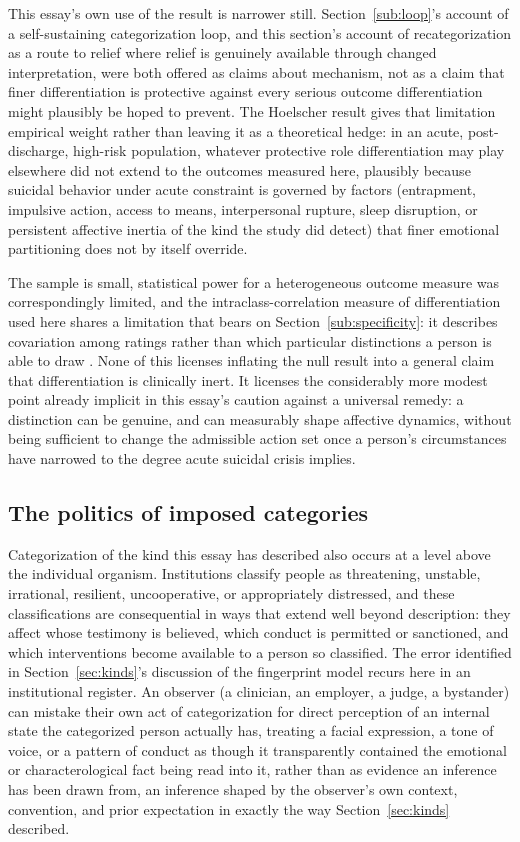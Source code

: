 \documentclass[11pt]{article}
\begin{document}
This essay's own use of the result is narrower still. Section~\ref{sub:loop}'s account of a self-sustaining categorization loop, and this section's account of recategorization as a route to relief where relief is genuinely available through changed interpretation, were both offered as claims about mechanism, not as a claim that finer differentiation is protective against every serious outcome differentiation might plausibly be hoped to prevent. The Hoelscher result gives that limitation empirical weight rather than leaving it as a theoretical hedge: in an acute, post-discharge, high-risk population, whatever protective role differentiation may play elsewhere did not extend to the outcomes measured here, plausibly because suicidal behavior under acute constraint is governed by factors (entrapment, impulsive action, access to means, interpersonal rupture, sleep disruption, or persistent affective inertia of the kind the study did detect) that finer emotional partitioning does not by itself override.

The sample is small, statistical power for a heterogeneous outcome measure was correspondingly limited, and the intraclass-correlation measure of differentiation used here shares a limitation that bears on Section~\ref{sub:specificity}: it describes covariation among ratings rather than which particular distinctions a person is able to draw \citep{Hoelscher2026}. None of this licenses inflating the null result into a general claim that differentiation is clinically inert. It licenses the considerably more modest point already implicit in this essay's caution against a universal remedy: a distinction can be genuine, and can measurably shape affective dynamics, without being sufficient to change the admissible action set once a person's circumstances have narrowed to the degree acute suicidal crisis implies.

\subsection{The politics of imposed categories}

Categorization of the kind this essay has described also occurs at a level above the individual organism. Institutions classify people as threatening, unstable, irrational, resilient, uncooperative, or appropriately distressed, and these classifications are consequential in ways that extend well beyond description: they affect whose testimony is believed, which conduct is permitted or sanctioned, and which interventions become available to a person so classified. The error identified in Section~\ref{sec:kinds}'s discussion of the fingerprint model recurs here in an institutional register. An observer (a clinician, an employer, a judge, a bystander) can mistake their own act of categorization for direct perception of an internal state the categorized person actually has, treating a facial expression, a tone of voice, or a pattern of conduct as though it transparently contained the emotional or characterological fact being read into it, rather than as evidence an inference has been drawn from, an inference shaped by the observer's own context, convention, and prior expectation in exactly the way Section~\ref{sec:kinds} described.
\end{document}

